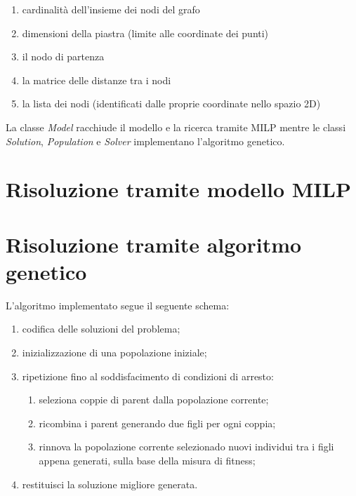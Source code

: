 \documentclass[a4paper]{article}
\begin{document}
        \begin{enumerate}
            \item cardinalit\`a dell'insieme dei nodi del grafo
            \item dimensioni della piastra (limite alle coordinate dei punti)
            \item il nodo di partenza
            \item la matrice delle distanze tra i nodi
            \item la lista dei nodi (identificati dalle proprie coordinate nello spazio 2D)
        \end{enumerate}

        La classe \emph{Model} racchiude il modello e la ricerca tramite MILP mentre le classi \emph{Solution}, \emph{Population} e \emph{Solver}
        implementano l'algoritmo genetico.
        
    \section{Risoluzione tramite modello MILP}

    \section{Risoluzione tramite algoritmo genetico}
        L'algoritmo implementato segue il seguente schema:
        \begin{enumerate}
            \item codifica delle soluzioni del problema;
            \item inizializzazione di una popolazione iniziale;
            \item ripetizione fino al soddisfacimento di condizioni di arresto:
                \begin{enumerate}
                    \item seleziona coppie di parent dalla popolazione corrente;
                    \item ricombina i parent generando due figli per ogni coppia;
                    \item rinnova la popolazione corrente selezionado nuovi individui
                        tra i figli appena generati, sulla base della misura di fitness;
                \end{enumerate}
            \item restituisci la soluzione migliore generata.
        \end{enumerate}
\end{document}
